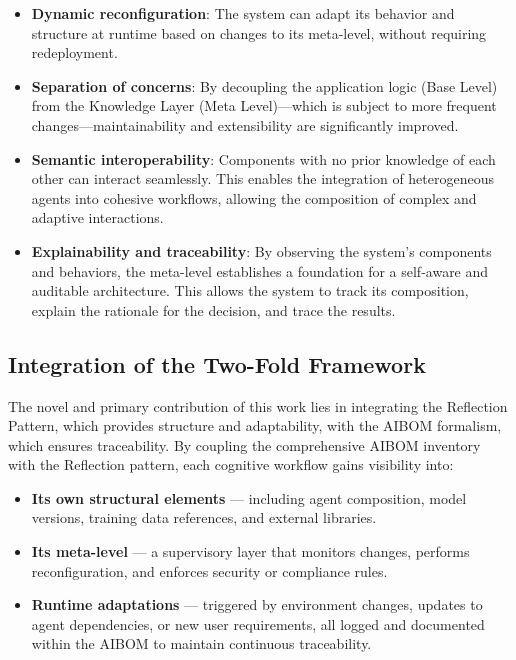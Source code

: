 \begin{itemize}[leftmargin=*, label=--] 

\item \textbf{Dynamic reconfiguration}: The system can adapt its behavior and structure at runtime based on changes to its meta-level, without requiring redeployment. 

\item \textbf{Separation of concerns}: By decoupling the application logic (Base Level) from the Knowledge Layer (Meta Level)—which is subject to more frequent changes—maintainability and extensibility are significantly improved.

\item \textbf{Semantic interoperability}: Components with no prior knowledge of each other can interact seamlessly. This enables the integration of heterogeneous agents into cohesive workflows, allowing the composition of complex and adaptive interactions.

\item \textbf{Explainability and traceability}: By observing the system’s components and behaviors, the meta-level establishes a foundation for a self-aware and auditable architecture. This allows the system to track its composition, explain the rationale for the decision, and trace the results.

\end{itemize}




\subsection{Integration of the Two-Fold Framework}


The novel and primary contribution of this work lies in integrating the Reflection Pattern, which provides structure and adaptability, with the AIBOM formalism, which ensures traceability. By coupling the comprehensive AIBOM inventory with the Reflection pattern, each cognitive workflow gains visibility into:

\begin{itemize}[leftmargin=*, label=--]
    \item \textbf{Its own structural elements} --- including agent composition, model versions, training data references, and external libraries.
    \item \textbf{Its meta-level} --- a supervisory layer that monitors changes, performs reconfiguration, and enforces security or compliance rules.
    \item \textbf{Runtime adaptations} --- triggered by environment changes, updates to agent dependencies, or new user requirements, all logged and documented within the AIBOM to maintain continuous traceability.
\end{itemize}

